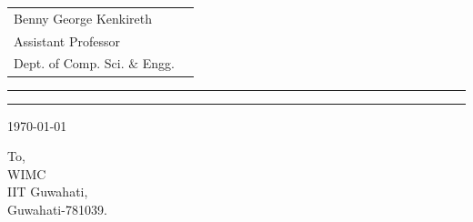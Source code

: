 \def\DevnagVersion{2.15}\documentclass[12pt]{article}
\begin{document}
\begin{minipage}{.35\linewidth}
  \begin{tabular}[t]{ll}
    Benny George Kenkireth& \\
    Assistant Professor\\
    Dept. of Comp. Sci. $\&$ Engg.
  \end{tabular}
\end{minipage} 
%
%

\vspace{2mm} 
\hrule 
\vspace{.3mm}
\hrule
\vspace{3mm}
\begin{flushright}
\today
\end{flushright}
\vspace{3mm}
\setlength{\parskip}{8pt}
\setlength{\parindent}{0pt}

To,\\
WIMC \\
IIT Guwahati,\\ 
Guwahati-781039. 
\bigskip
\end{document}
